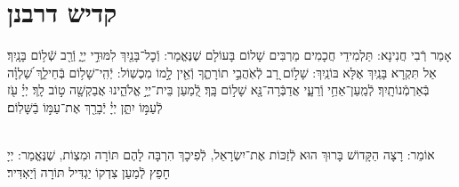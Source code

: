 \documentclass[twoside, openany, parskip=half, 11pt]{book}
\begin{document}
\tachanunim

\vfill


\sepline


\chapter[קדיש דרבנן]{ קדיש דרבנן }
\label{kaddish derabonan}


אָמַר רְֿבִי חֲנִינָא: תַּלְמִידֵי חֲכָמִים מַרְבִּים שָׁלוֹם בָּעוֹלָם שֶׁנֶּאֱמַר: וְֿכׇל־בָּנַ֖יִךְ לִמּוּדֵ֣י יְיָ֑ וְֿרַ֖ב שְֿׁל֥וֹם בָּנָֽיִךְ׃ אַל תִּקְרָא בָּנַֽיִךְ אֶלָּא בּוֹנַֽיִךְ: שָׁל֣וֹם רָ֭ב לְֿאֹֽהֲבֵ֣י תוֹרָתֶ֑ךָ וְֿאֵ֖ין לָ֣מוֹ מִכְשֽׁוֹל: יְֿהִֽי־שָׁל֥וֹם בְּֿחֵילֵ֑ךְ שַׁ֝לְוָ֗ה בְּֿאַרְמְֿנוֹתָֽיִךְ׃ לְֿמַֽעַן־אַחַ֥י וְֿרֵעָ֑י אֲדַבְּֿרָה־נָּ֖א שָׁל֣וֹם בָּֽךְ׃ לְֿ֭מַעַן בֵּית־יְיָ֣ אֱלֹהֵ֑ינוּ אֲבַקְשָׁ֖ה ט֣וֹב לָֽךְ׃ יְיָ֗ עֹ֖ז לְֿעַמּ֣וֹ יִתֵּ֑ן יְיָ֓ יְֿבָרֵ֖ךְ אֶת־עַמּ֣וֹ בַֿשָּׁלֽוֹם׃

\\
אוֹמֵר: רָצָה הַקָּדוֹשׁ בָּרוּךְ הוּא לְֿזַכּוֹת אֶת־יִשְׂרָאֵל, לְֿפִיכָךְ הִרְבָּה לָהֶם תּוֹרָה וּמִצְוֹת, שֶׁנֶּאֱמַר:
יְיָ חָפֵץ לְֿמַעַן צִדְקוֹ יַגְדִּיל תּוֹרָה וְֿיַאְדִּיר׃


\begin{kaddish}

\rabbiskaddish
\end{kaddish}

\vfill
{}\quad{}\quad{}
\end{document}
